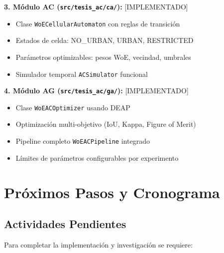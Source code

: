 \documentclass[12pt,letterpaper]{article}
\begin{document}
\textbf{3. Módulo AC (\texttt{src/tesis\_ac/ca/}):} [IMPLEMENTADO]
\begin{itemize}
\item Clase \texttt{WoECellularAutomaton} con reglas de transición
\item Estados de celda: NO\_URBAN, URBAN, RESTRICTED
\item Parámetros optimizables: pesos WoE, vecindad, umbrales
\item Simulador temporal \texttt{ACSimulator} funcional
\end{itemize}

\textbf{4. Módulo AG (\texttt{src/tesis\_ac/ga/}):} [IMPLEMENTADO]
\begin{itemize}
\item Clase \texttt{WoEACOptimizer} usando DEAP
\item Optimización multi-objetivo (IoU, Kappa, Figure of Merit)
\item Pipeline completo \texttt{WoEACPipeline} integrado
\item Límites de parámetros configurables por experimento
\end{itemize}

\section{Próximos Pasos y Cronograma}

\subsection{Actividades Pendientes}

Para completar la implementación y investigación se requiere:
\end{document}

